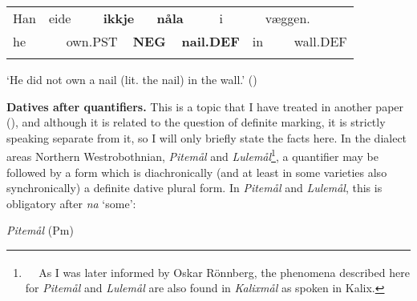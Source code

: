 \begin{tabular}{llllllllllll}
\lsptoprule
Han & \multicolumn{2}{l}{eide

} & \multicolumn{2}{l}{{\bfseries ikkje}

} & \multicolumn{2}{l}{{\bfseries nåla}

} & \multicolumn{2}{l}{i

} & \multicolumn{2}{l}{væggen.

} & \\
\multicolumn{2}{l}{he

} & \multicolumn{2}{l}{own.PST

} & \multicolumn{2}{l}{{\bfseries NEG}

} & \multicolumn{2}{l}{{\bfseries nail.DEF}

} & \multicolumn{2}{l}{in

} & \multicolumn{2}{l}{wall.DEF

}\\
\lspbottomrule
\end{tabular}

\begin{styleTranslation}
‘He did not own a nail (lit. the nail) in the wall.’ (\citet[18]{Iversen1918})

\end{styleTranslation}

\begin{styleBodytextC}
\textbf{Datives after quantifiers. }This is a topic that I have treated in another paper (\citet{Dahl2008}), and although it is related to the question of definite marking, it is strictly speaking separate from it, so I will only briefly state the facts here. In the dialect areas Northern Westrobothnian, \textit{Pitemål} and \textit{Lulemål}\footnote{\textsuperscript{\ \ } As I was later informed by Oskar Rönnberg, the phenomena described here for \textit{Pitemål} and \textit{Lulemål} are also found in \textit{Kalixmål }as spoken in Kalix.}, a quantifier may be followed by a form which is diachronically (and at least in some varieties also synchronically) a definite dative plural form. In \textit{Pitemål} and \textit{Lulemål}, this is obligatory after \textit{na} ‘some’:

\end{styleBodytextC}

\begin{listWWNumileveli}
\item {}

\begin{styleExample}
\textit{Pitemål }(Pm)

\end{styleExample}

\end{listWWNumileveli}

